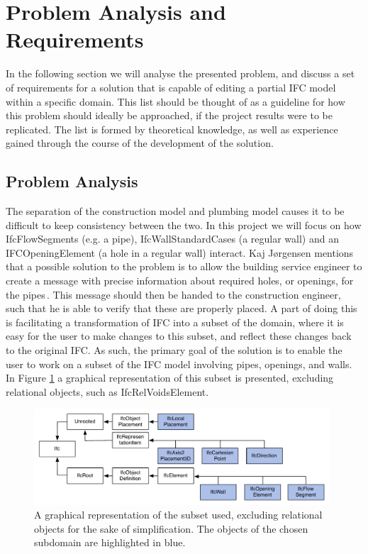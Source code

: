 \section{Problem Analysis and Requirements}
\label{sec:problem_analysis_and_requirements}
In the following section we will analyse the presented problem, and discuss a set of requirements for a solution that is capable of editing a partial IFC model within a specific domain. This list should be thought of as a guideline for how this problem should ideally be approached, if the project results were to be replicated. The list is formed by theoretical knowledge, as well as experience gained through the course of the development of the solution.

\subsection{Problem Analysis}
\label{subsec:problem_analysis}
The separation of the construction model and plumbing model causes it to be difficult to keep consistency between the two. In this project we will focus on how IfcFlowSegments (e.g. a pipe), IfcWallStandardCases (a regular wall) and an IFCOpeningElement (a hole in a regular wall) interact. Kaj Jørgensen mentions that a possible solution to the problem is to allow the building service engineer to create a message with precise information about required holes, or openings, for the pipes\,\cite{jorgensen12}. This message should then be handed to the construction engineer, such that he is able to verify that these are properly placed. A part of doing this is facilitating a transformation of IFC into a subset of the domain, where it is easy for the user to make changes to this subset, and reflect these changes back to the original IFC. As such, the primary goal of the solution is to enable the user to work on a subset of the IFC model involving pipes, openings, and walls. In Figure \ref{fig:ifcheirachy} a graphical representation of this subset is presented, excluding relational objects, such as IfcRelVoidsElement.

\begin{figure}[t]
    \centering
        \includegraphics[width=110mm]{images/IfcHeirachy.pdf}
    \caption{A graphical representation of the subset used, excluding relational objects for the sake of simplification. The objects of the chosen subdomain are highlighted in blue.}
    \label{fig:ifcheirachy}
\end{figure}

